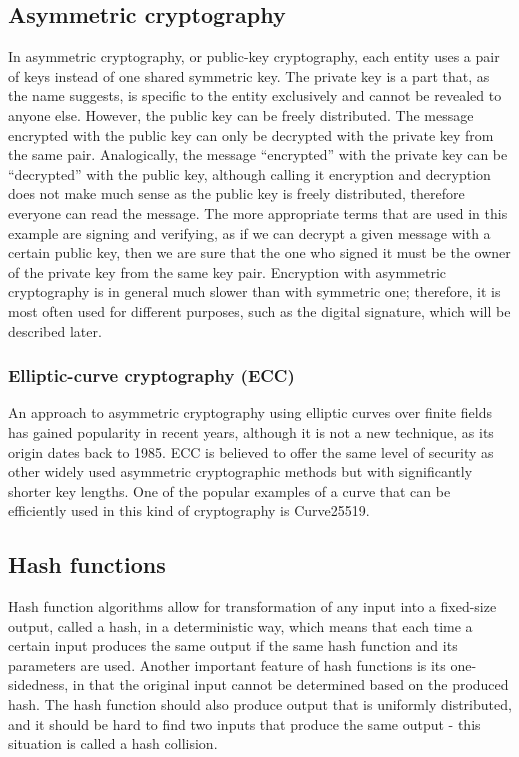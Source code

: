 \subsection{Asymmetric cryptography}
In asymmetric cryptography, or public-key cryptography, each entity uses a pair of keys instead of one shared symmetric key. The private key is a part that, as the name suggests, is specific to the entity exclusively and cannot be revealed to anyone else. However, the public key can be freely distributed. The message encrypted with the public key can only be decrypted with the private key from the same pair. Analogically, the message “encrypted” with the private key can be “decrypted” with the public key, although calling it encryption and decryption does not make much sense as the public key is freely distributed, therefore everyone can read the message. The more appropriate terms that are used in this example are signing and verifying, as if we can decrypt a given message with a certain public key, then we are sure that the one who signed it must be the owner of the private key from the same key pair.
Encryption with asymmetric cryptography is in general much slower than with symmetric one; therefore, it is most often used for different purposes, such as the digital signature, which will be described later.

\subsubsection{Elliptic-curve cryptography (ECC)}
An approach to asymmetric cryptography using elliptic curves over finite fields has gained popularity in recent years, although it is not a new technique, as its origin dates back to 1985. ECC is believed to offer the same level of security as other widely used asymmetric cryptographic methods but with significantly shorter key lengths. One of the popular examples of a curve that can be efficiently used in this kind of cryptography is Curve25519.

\subsection{Hash functions}
Hash function algorithms allow for transformation of any input into a fixed-size output, called a hash, in a deterministic way, which means that each time a certain input produces the same output if the same hash function and its parameters are used. Another important feature of hash functions is its one-sidedness, in that the original input cannot be determined based on the produced hash. The hash function should also produce output that is uniformly distributed, and it should be hard to find two inputs that produce the same output - this situation is called a hash collision.

